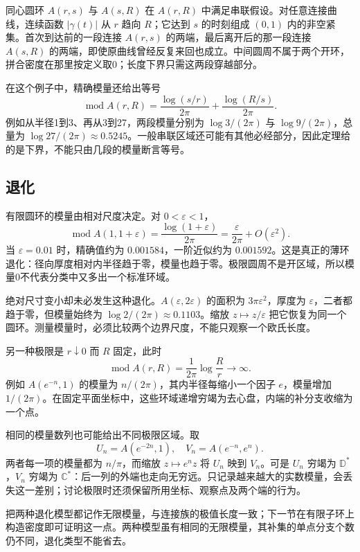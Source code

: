 \ProseParagraphBreak
同心圆环 \(A(r,s)\) 与 \(A(s,R)\) 在 \(A(r,R)\) 中满足串联假设。对任意连接曲线，连续函数 \(|\gamma(t)|\) 从 \(r\) 趋向 \(R\)；它达到 \(s\) 的时刻组成 \((0,1)\) 内的非空紧集。首次到达前的一段连接 \(A(r,s)\) 的两端，最后离开后的那一段连接 \(A(s,R)\) 的两端，即使原曲线曾经反复来回也成立。中间圆周不属于两个开环，拼合密度在那里按定义取0；长度下界只需这两段穿越部分。

\ProseParagraphBreak
在这个例子中，精确模量还给出等号
\[
 \operatorname{mod}A(r,R)
 =\frac{\log(s/r)}{2\pi}+\frac{\log(R/s)}{2\pi}.
\]
例如从半径1到3、再从3到27，两段模量分别为 \(\log3/(2\pi)\) 与 \(\log9/(2\pi)\)，总量为 \(\log27/(2\pi)\approx0.5245\)。一般串联区域还可能有其他必经部分，因此定理给的是下界，不能只由几段的模量断言等号。

\subsection{退化}
\label{b3:subsec:080204}

有限圆环的模量由相对尺度决定。对 \(0<\varepsilon<1\)，
\[
 \operatorname{mod}A(1,1+\varepsilon)
 =\frac{\log(1+\varepsilon)}{2\pi}
 =\frac{\varepsilon}{2\pi}+O(\varepsilon^2).
\]
当 \(\varepsilon=0.01\) 时，精确值约为 \(0.001584\)，一阶近似约为 \(0.001592\)。这是真正的薄环退化：径向厚度相对内半径趋于零，模量也趋于零。极限圆周不是开区域，所以模量0不代表分类中又多出一个标准环域。

\ProseParagraphBreak
绝对尺寸变小却未必发生这种退化。\(A(\varepsilon,2\varepsilon)\) 的面积为 \(3\pi\varepsilon^2\)，厚度为 \(\varepsilon\)，二者都趋于零，但模量始终为 \(\log2/(2\pi)\approx0.1103\)。缩放 \(z\mapsto z/\varepsilon\) 把它恢复为同一个圆环。测量模量时，必须比较两个边界尺度，不能只观察一个欧氏长度。

\ProseParagraphBreak
另一种极限是 \(r\downarrow0\) 而 \(R\) 固定，此时
\[
 \operatorname{mod}A(r,R)=\frac1{2\pi}\log\frac Rr\longrightarrow\infty.
\]
例如 \(A(e^{-n},1)\) 的模量为 \(n/(2\pi)\)，其内半径每缩小一个因子 \(e\)，模量增加 \(1/(2\pi)\)。在固定平面坐标中，这些环域递增穷竭为去心盘，内端的补分支收缩为一个点。

\ProseParagraphBreak
相同的模量数列也可能给出不同极限区域。取
\[
 U_n=A(e^{-2n},1),\quad V_n=A(e^{-n},e^n).
\]
两者每一项的模量都为 \(n/\pi\)，而缩放 \(z\mapsto e^nz\) 将 \(U_n\) 映到 \(V_n\)。可是 \(U_n\) 穷竭为 \(\mathbb D^*\)，\(V_n\) 穷竭为 \(\mathbb C^*\)：后一列的外端也走向无穷远。只记录越来越大的实数模量，会丢失这一差别；讨论极限时还须保留所用坐标、观察点及两个端的行为。

\ProseParagraphBreak
把两种退化模型都记作无限模量，与连接族的极值长度一致；下一节在有限子环上构造密度即可证明这一点。两种模型虽有相同的无限模量，其补集的单点分支个数仍不同，退化类型不能省去。
